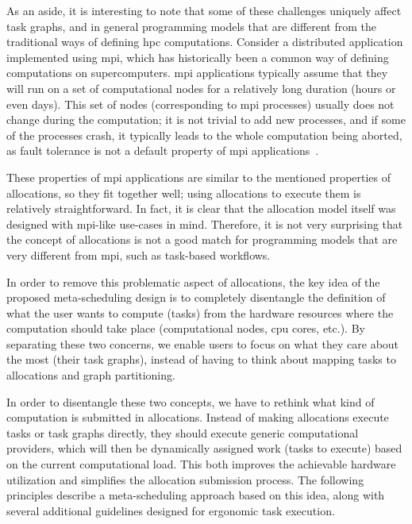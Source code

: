 As an aside, it is interesting to note that some of these challenges uniquely affect task graphs,
and in general programming models that are different from the traditional ways of defining
\gls{hpc} computations. Consider a distributed application implemented using
\gls{mpi}, which has historically been a common way of defining computations on
supercomputers. \gls{mpi} applications typically assume that they will run on a set
of computational nodes for a relatively long duration (hours or even days). This set of nodes
(corresponding to \gls{mpi} processes) usually does not change during the
computation; it is not trivial to add new processes, and if some of the processes crash, it
typically leads to the whole computation being aborted, as fault tolerance is not a default
property of \gls{mpi} applications~\cite{fault_tolerant_mpi}.

These properties of \gls{mpi} applications are similar to the mentioned properties of
allocations, so they fit together well; using allocations to execute them is relatively
straightforward. In fact, it is clear that the allocation model itself was designed with
\gls{mpi}-like use-cases in mind. Therefore, it is not very surprising that the
concept of allocations is not a good match for programming models that are very different from
\gls{mpi}, such as task-based workflows.

In order to remove this problematic aspect of allocations, the key idea of the proposed
meta-scheduling design is to completely disentangle the definition of what the user wants to
compute (tasks) from the hardware resources where the computation should take place (computational
nodes, \gls{cpu} cores, etc.). By separating these two concerns, we enable users to
focus on what they care about the most (their task graphs), instead of having to think about
mapping tasks to allocations and graph partitioning.

In order to disentangle these two concepts, we have to rethink what kind of computation is
submitted in allocations. Instead of making allocations execute tasks or task graphs directly, they
should execute generic computational providers, which will then be dynamically assigned work (tasks
to execute) based on the current computational load. This both improves the achievable hardware
utilization and simplifies the allocation submission process. The following principles describe a
meta-scheduling approach based on this idea, along with several additional guidelines designed for
ergonomic task execution.

